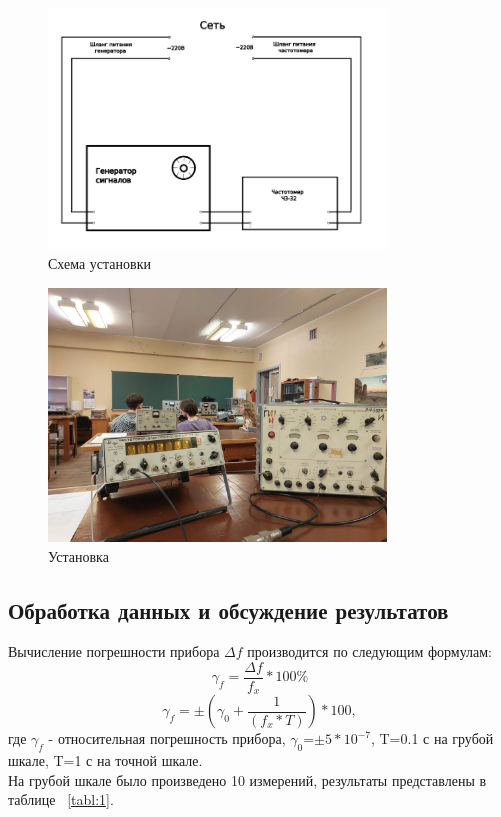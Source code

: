 \begin{figure}[H]
\centering
\includegraphics[width=0.8\textwidth]{Схема установки}
\caption{Схема установки}
\label{fig:Схема установки}
\end{figure}



\begin{figure}[H]
\centering
\includegraphics[width=0.8\textwidth]{Установка.jpg}
\caption{Установка}
\label{fig:установка}
\end{figure}

\subsection{Обработка данных и обсуждение результатов}
Вычисление погрешности прибора $\Delta f$ производится по следующим формулам:
\begin{equation}
   \gamma_f=  \frac{\Delta f}{f_x}*100\%
   \label{eq:6}
\end{equation}
\begin{equation}
 \gamma_f=\pm(\gamma_0+\frac{1}{(f_x*T)})*100,
    \label{eq:7}
 \end{equation}
 где $\gamma_f$ - относительная погрешность прибора, $\gamma_0$=$\pm$$5*10^{-7}$, T=0.1 с на грубой шкале, T=1 с на точной шкале.\\
 На грубой шкале было произведено 10 измерений, результаты представлены в таблице ~\ref{tabl:1}.

